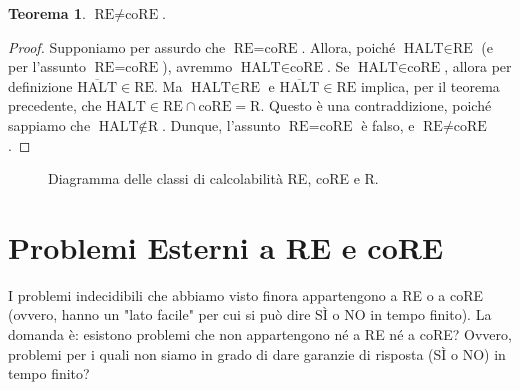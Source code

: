 \documentclass[a4paper]{article}
\theoremstyle{definition} %
\newtheorem{theorem}{Teorema}
\begin{document}
\begin{theorem}
$\text{RE} \neq \text{coRE}$.
\end{theorem}
\begin{proof}
Supponiamo per assurdo che $\text{RE} = \text{coRE}$.
Allora, poiché $\text{HALT} \in \text{RE}$ (e per l'assunto $\text{RE} = \text{coRE}$), avremmo $\text{HALT} \in \text{coRE}$.
Se $\text{HALT} \in \text{coRE}$, allora per definizione $\overline{\text{HALT}} \in \text{RE}$.
Ma $\text{HALT} \in \text{RE}$ e $\overline{\text{HALT}} \in \text{RE}$ implica, per il teorema precedente, che $\text{HALT} \in \text{RE} \cap \text{coRE} = \text{R}$.
Questo è una contraddizione, poiché sappiamo che $\text{HALT} \notin \text{R}$.
Dunque, l'assunto $\text{RE} = \text{coRE}$ è falso, e $\text{RE} \neq \text{coRE}$.
\end{proof}

\begin{figure}[h]
    \centering
    \caption{Diagramma delle classi di calcolabilit\`a RE, coRE e R.}
\end{figure}

\section{Problemi Esterni a RE e coRE}
I problemi indecidibili che abbiamo visto finora appartengono a RE o a coRE (ovvero, hanno un "lato facile" per cui si può dire SÌ o NO in tempo finito). La domanda è: esistono problemi che non appartengono né a RE né a coRE? Ovvero, problemi per i quali non siamo in grado di dare garanzie di risposta (SÌ o NO) in tempo finito?
\end{document}

